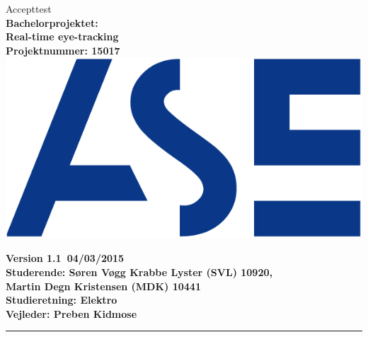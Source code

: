 \documentclass[a4paper,oneside,12pt]{article}
\begin{document}
\begin{titlepage}
\centering
\vfill
{\LARGE Accepttest}\\
\vfill
{\bfseries\large
	Bachelorprojektet: \\
	Real-time eye-tracking\\
	Projektnummer: 15017\\
}
\vfill
\includegraphics{ASE_logo.png}
\vfill
{\bfseries\large
	Version 1.1\
	04/03/2015\\
	Studerende: Søren Vøgg Krabbe Lyster (SVL) 10920,\\
	Martin Degn Kristensen (MDK) 10441\\ 
	Studieretning: Elektro \\
	Vejleder: Preben Kidmose \\
	\vfill	
	\rule{6cm}{1pt}
}




\end{titlepage}
\begin{versionhistory}
\end{versionhistory}
\tableofcontents

	


%
%
\end{document}

